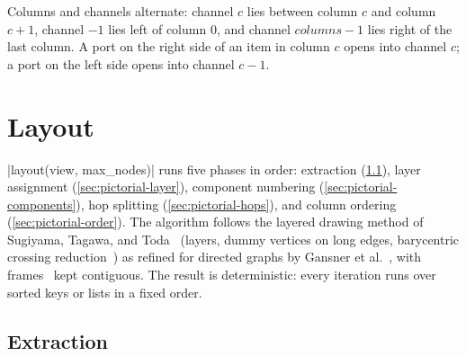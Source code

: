 Columns and channels alternate: channel $c$ lies between column $c$ and column $c+1$, channel
$-1$ lies left of column 0, and channel $\mathit{columns}-1$ lies right of the last column. A
port on the right side of an item in column $c$ opens into channel $c$; a port on the left side
opens into channel $c-1$.

\section{Layout}\label{sec:pictorial-layout}

\py|layout(view, max_nodes)| runs five phases in order: extraction
(\cref{sec:pictorial-extract}), layer assignment (\cref{sec:pictorial-layer}), component
numbering (\cref{sec:pictorial-components}), hop splitting (\cref{sec:pictorial-hops}), and
column ordering (\cref{sec:pictorial-order}). The algorithm follows the layered drawing method
of Sugiyama, Tagawa, and Toda~\cite{sugiyama1981methods} (layers, dummy vertices on long edges,
barycentric crossing reduction~\cite{eades1994edge}) as refined for directed graphs by Gansner
et al.~\cite{gansner1993technique}, with \bbox{} frames~\cite{kissinger2014pattern} kept
contiguous. The result is deterministic: every iteration runs over sorted keys or lists in a
fixed order.

\subsection{Extraction}\label{sec:pictorial-extract}

